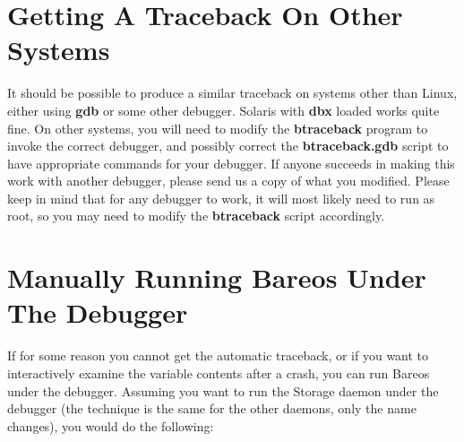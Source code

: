 \section{Getting A Traceback On Other Systems}

It should be possible to produce a similar traceback on systems other than
Linux, either using {\bf gdb} or some other debugger. Solaris with {\bf dbx}
loaded works quite fine. On other systems, you will need to modify the {\bf
btraceback} program to invoke the correct debugger, and possibly correct the
{\bf btraceback.gdb} script to have appropriate commands for your debugger. If
anyone succeeds in making this work with another debugger, please send us a
copy of what you modified. Please keep in mind that for any debugger to
work, it will most likely need to run as root, so you may need to modify
the {\bf btraceback} script accordingly.

\label{ManuallyDebugging}
\section{Manually Running Bareos Under The Debugger}

If for some reason you cannot get the automatic traceback, or if you want to
interactively examine the variable contents after a crash, you can run Bareos
under the debugger. Assuming you want to run the Storage daemon under the
debugger (the technique is the same for the other daemons, only the name
changes), you would do the following:

